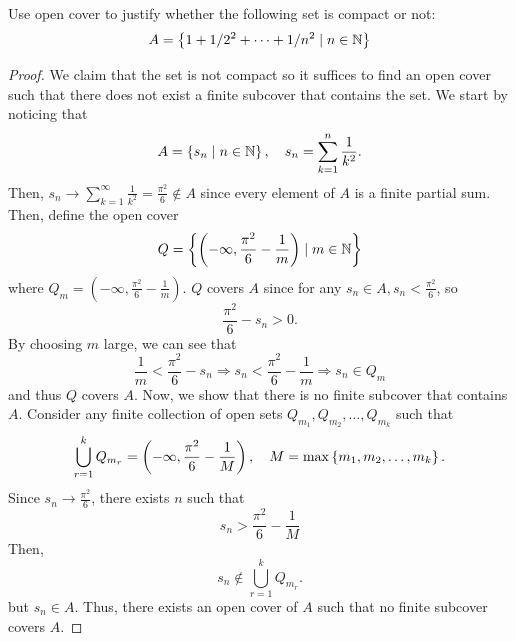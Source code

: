 \documentclass{exam}
\begin{document}
Use open cover to justify whether the following set is compact or not: 
\[
    A = \left\{1 + 1/2^2 + \cdots + 1/n^2 \mid n \in \mathbb{N} \right\}
\]
    \begin{proof}
        We claim that the set is not compact so it suffices to find an open cover such that there does not exist a finite subcover that contains the set. We start by noticing that 
        \[
            A = \left\{s_n \mid n \in \mathbb{N} \right\}, \quad s_n = \sum_{k=1}^{n} \frac{1}{k^2}.
        \]
        Then, $s_n \to \sum_{k=1}^{\infty}\frac{1}{k^2} = \frac{\pi^2}{6} \not\in A$ since every element of $A$ is a finite partial sum. Then, define the open cover 
        \[
            Q = \left\{\left(-\infty, \frac{\pi^2}{6} - \frac{1}{m} \right) \mid m \in \mathbb{N} \right\} 
        \]
        where $Q_m = \left(-\infty, \frac{\pi^2}{6} - \frac{1}{m}\right)$. $Q$ covers $A$ since for any $s_n \in A, s_n < \frac{\pi^2}{6}$, so 
        \[
            \frac{\pi^2}{6} - s_n > 0. 
        \] 
        By choosing $m$ large, we can see that 
        \[
            \frac{1}{m} < \frac{\pi^2}{6} - s_n \Rightarrow s_n < \frac{\pi^2}{6} - \frac{1}{m} \Rightarrow s_n \in Q_m
        \]
        and thus $Q$ covers $A$. Now, we show that there is no finite subcover that contains $A$. Consider any finite collection of open sets $Q_{m_1}, Q_{m_2}, \ldots, Q_{m_k}$ such that 
        \[
            \bigcup_{r=1}^{k} Q_{m_r} = \left(-\infty, \frac{\pi^2}{6} - \frac{1}{M}\right), \quad M = \max\left\{m_1, m_2, \ldots, m_{k} \right\}.
        \]
        Since $s_n \to \frac{\pi^2}{6}$, there exists $n$ such that 
        \[
            s_n > \frac{\pi^2}{6} - \frac{1}{M}
        \]
        Then, 
        \[ 
           s_n \not\in \bigcup_{r=1}^{k} Q_{m_r}.
        \]
        but $s_n \in A$. Thus, there exists an open cover of $A$ such that no finite subcover covers $A$.
    \end{proof}
\end{document}

